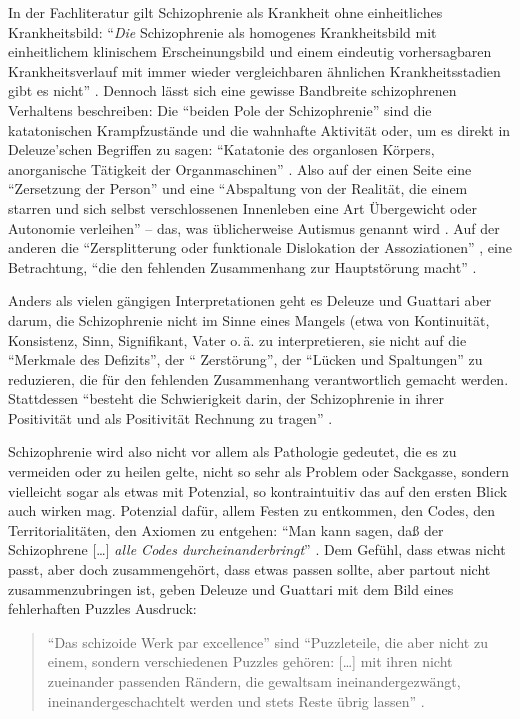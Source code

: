 \documentclass[12pt,
               DIV13,
               paper=a4,
               twoside=false,
               onehalfspacing,
               bibliography=totoc,
               toc=graduated,
               draft,
               ]{scrartcl}
\newcommand{\lips}{\dots\unkern}
\newcommand{\pc}[2]{\parencite[#1]{#2}}
\newcommand{\vgl}[2]{\parencite[vgl.][#1]{#2}}
\newcommand{\worries}[1]{\ifdraft{\textcolor{blue}{\texttt{(#1)}}}{}}
\newcommand{\gwg}{G--W--G'\xspace}
\newcommand{\dg}{Deleuze und Guattari\xspace}
\begin{document}
In der Fachliteratur gilt Schizophrenie als Krankheit ohne
einheitliches Krankheitsbild: "`\emph{Die} Schizophrenie als homogenes
Krankheitsbild mit einheitlichem klinischem Erscheinungsbild und einem
eindeutig vorhersagbaren Krankheitsverlauf mit immer wieder
vergleichbaren ähnlichen Krankheitsstadien gibt es nicht"' \pc{S. 799,
Hervorh. im Orig.}{psych}. Dennoch lässt sich eine gewisse Bandbreite
schizophrenen Verhaltens beschreiben: Die "`beiden Pole der
Schizophrenie"' \pc{21}{schizg} sind die katatonischen Krampfzustände
und die wahnhafte Aktivität oder, um es direkt in Deleuze'schen
Begriffen zu sagen: "`Katatonie des organlosen Körpers, anorganische
Tätigkeit der Organmaschinen"' \pc{21}{schizg}. Also auf der einen
Seite eine "`Zersetzung der Person"' und eine "`Abspaltung von der
Realität, die einem starren und sich selbst verschlossenen Innenleben
eine Art Übergewicht oder Autonomie verleihen"' \pc{23}{schizg} --
das, was üblicherweise Autismus genannt wird \vgl{801}{psych}. Auf der
anderen die "`Zersplitterung oder funktionale Dislokation der
Assoziationen"' \pc{23}{schizg}, eine Betrachtung, "`die den fehlenden
Zusammenhang zur Hauptstörung macht"' \pc{23}{schizg}.


%

Anders als vielen gängigen Interpretationen geht es Deleuze und
Guattari aber darum, die Schizophrenie nicht im Sinne eines Mangels
(etwa von Kontinuität, Konsistenz, Sinn, Signifikant, Vater o.\,ä.
\vgl{24}{schizg}
zu interpretieren, sie nicht auf die "`Merkmale des Defizits"', der "`
Zerstörung"', der "`Lücken und Spaltungen"' \pc{24}{schizg} zu
reduzieren, die für den fehlenden Zusammenhang verantwortlich gemacht
werden. Stattdessen "`besteht die Schwierigkeit darin, der
Schizophrenie in ihrer Positivität und als Positivität Rechnung zu
tragen"' \pc{24}{schizg}.

Schizophrenie wird also nicht vor allem als Pathologie gedeutet, die
es zu vermeiden oder zu heilen gelte, nicht so sehr als Problem oder
Sackgasse, sondern vielleicht sogar als etwas mit Potenzial, so
kontraintuitiv das auf den ersten Blick auch wirken mag. Potenzial
dafür, allem Festen zu entkommen, den Codes, den Territorialitäten, den
Axiomen zu entgehen: "`Man kann sagen, daß der Schizophrene [\lips]
\emph{alle Codes durcheinanderbringt}"' \pc{S. 22, Hervorh. im
Orig.}{ao}. Dem Gefühl, dass etwas nicht passt, aber doch
zusammengehört, dass etwas passen sollte, aber partout nicht
zusammenzubringen ist, geben \dg mit dem Bild eines fehlerhaften
Puzzles Ausdruck:
%
\begin{spacing}{1}
\begin{quote}
"`Das schizoide Werk par excellence"' \pc{54}{ao} sind "`Puzzleteile,
die aber nicht zu einem, sondern verschiedenen Puzzles gehören:
[\lips] mit ihren nicht zueinander passenden Rändern, die gewaltsam
ineinandergezwängt, ineinandergeschachtelt werden und stets Reste
übrig lassen"' \pc{54}{ao}.
\end{quote}
\end{spacing}
\end{document}
